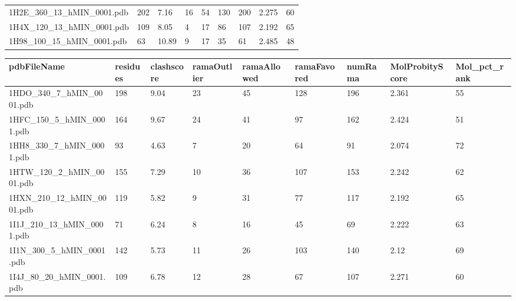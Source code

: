 \documentclass{bioinfo}
\begin{document}
\begin{table}[!t]
{\begin{tabular}{lllllllll}
    1H2E\_360\_13\_hMIN\_0001.pdb & 202      & 7.16       & 16          & 54          & 130         & 200     & 2.275           & 60           \\
    1H4X\_120\_13\_hMIN\_0001.pdb & 109      & 8.05       & 4           & 17          & 86          & 107     & 2.192           & 65           \\
    1H98\_100\_15\_hMIN\_0001.pdb & 63       & 10.89      & 9           & 17          & 35          & 61      & 2.485           & 48           \\
\end{tabular}}{}
\end{table}


\begin{table}[!t]
{\begin{tabular}{lllllllll}\toprule
    pdbFileName             & residues & clashscore & ramaOutlier & ramaAllowed & ramaFavored & numRama & MolProbityScore & Mol\_pct\_rank \\ \midrule
    1HDO\_340\_7\_hMIN\_0001.pdb & 198      & 9.04       & 23          & 45          & 128         & 196     & 2.361           & 55           \\
    1HFC\_150\_5\_hMIN\_0001.pdb & 164      & 9.67       & 24          & 41          & 97          & 162     & 2.424           & 51           \\
    1HH8\_330\_7\_hMIN\_0001.pdb & 93       & 4.63       & 7           & 20          & 64          & 91      & 2.074           & 72           \\
    1HTW\_120\_2\_hMIN\_0001.pdb & 155      & 7.29       & 10          & 36          & 107         & 153     & 2.242           & 62           \\
    1HXN\_210\_12\_hMIN\_0001.pdb & 119      & 5.82       & 9           & 31          & 77          & 117     & 2.192           & 65           \\
    1I1J\_210\_13\_hMIN\_0001.pdb & 71       & 6.24       & 8           & 16          & 45          & 69      & 2.222           & 63           \\
    1I1N\_300\_5\_hMIN\_0001.pdb & 142      & 5.73       & 11          & 26          & 103         & 140     & 2.12            & 69           \\
    1I4J\_80\_20\_hMIN\_0001.pdb & 109      & 6.78       & 12          & 28          & 67          & 107     & 2.271           & 60           \\

\end{tabular}}
\end{table}
\end{document}
